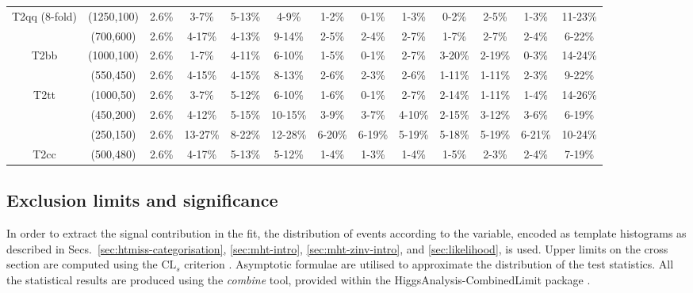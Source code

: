 \begin{landscape}
\begin{table}[h!]
\begin{tabular}{ ccccccccccccc }
        \multirow{2}{*}{T2qq (8-fold)}
            & (1250,100) & 2.6\% & 3-7\% & 5-13\% & 4-9\% & 1-2\% & 0-1\% & 1-3\% & 0-2\% & 2-5\% & 1-3\% & 11-23\% \\
            & (700,600)  & 2.6\% & 4-17\% & 4-13\% & 9-14\% & 2-5\% & 2-4\% & 2-7\% & 1-7\% & 2-7\% & 2-4\% & 6-22\% \\
        \hline
        \multirow{2}{*}{T2bb}
            & (1000,100) & 2.6\% & 1-7\% & 4-11\% & 6-10\% & 1-5\% & 0-1\% & 2-7\% & 3-20\% & 2-19\% & 0-3\% & 14-24\% \\
            & (550,450)  & 2.6\% & 4-15\% & 4-15\% & 8-13\% & 2-6\% & 2-3\% & 2-6\% & 1-11\% & 1-11\% & 2-3\% & 9-22\% \\
        \hline
        \multirow{2}{*}{T2tt}
            & (1000,50) & 2.6\% & 3-7\% & 5-12\% & 6-10\% & 1-6\% & 0-1\% & 2-7\% & 2-14\% & 1-11\% & 1-4\% & 14-26\% \\
            & (450,200) & 2.6\% & 4-12\% & 5-15\% & 10-15\% & 3-9\% & 3-7\% & 4-10\% & 2-15\% & 3-12\% & 3-6\% & 6-19\% \\
            & (250,150) & 2.6\% & 13-27\% & 8-22\% & 12-28\% & 6-20\% & 6-19\% & 5-19\% & 5-18\% & 5-19\% & 6-21\% & 10-24\% \\
        \hline
        \multirow{1}{*}{T2cc}
            & (500,480) & 2.6\% & 4-17\% & 5-13\% & 5-12\% & 1-4\% & 1-3\% & 1-4\% & 1-5\% & 2-3\% & 2-4\% & 7-19\% \\
        \hline \hline
    \end{tabular}
\end{table}
\end{landscape}

\clearpage
\subsection{Exclusion limits and significance}
\label{sec:susy_results}

In order to extract the signal contribution in the fit, the
distribution of events according to the \mht variable, encoded as
template histograms as described in
Secs.~\ref{sec:htmiss-categorisation}, \ref{sec:mht-intro},
\ref{sec:mht-zinv-intro}, and \ref{sec:likelihood}, is used. Upper
limits on the cross section are computed using the $\text{CL}_{s}$
criterion \cite{CLsTechnique}. Asymptotic formulae
\cite{AsymptoticFormulae} are utilised to approximate the distribution
of the test statistics. All the statistical results are produced using
the \textit{combine} tool, provided within the
HiggsAnalysis-CombinedLimit package \cite{Combine}.

